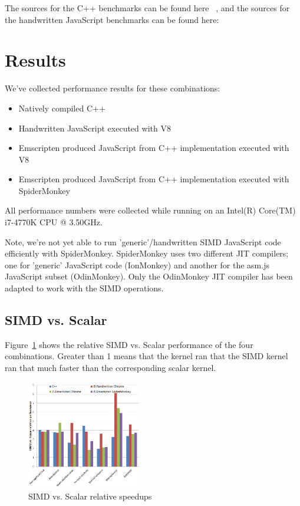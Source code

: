 \documentclass[preprint]{sigplanconf}
\begin{document}
The sources for the C++ benchmarks can be found here ~\cite{github-benchcpp}, and the sources
for the handwritten JavaScript benchmarks can be found here: ~\cite{github-benchjs}

\section{Results}

We've collected performance results for these combinations:

\begin{itemize}
\item
Natively compiled C++

\item
Handwritten JavaScript executed with V8

\item
Emscripten produced JavaScript from C++ implementation executed with V8

\item
Emscripten produced JavaScript from C++ implementation executed with
SpiderMonkey
\end{itemize}

All performance numbers were collected while running on an Intel(R) Core(TM) i7-4770K CPU @ 3.50GHz.

Note, we're not yet able to run 'generic'/handwritten SIMD JavaScript code
efficiently with SpiderMonkey.  SpiderMonkey uses two different JIT compilers;
one for 'generic' JavaScript code (IonMonkey) and another for the asm.js
JavaScript subset (OdinMonkey).  Only the OdinMonkey JIT compiler has been
adapted to work with the SIMD operations.

\subsection{SIMD vs. Scalar}

Figure~\ref{fig:simd-scalar-speedup} shows the relative SIMD vs. Scalar performance
of the four combinations.  Greater than 1 means that the kernel ran that the SIMD
kernel ran that much faster than the corresponding scalar kernel.

\begin{figure}
\begin{center}
\includegraphics[width=0.45\textwidth]{figures/simd-scalar-speedup.png}
\end{center}
\caption{SIMD vs. Scalar relative speedups}
\label{fig:simd-scalar-speedup}
\end{figure}
\end{document}
